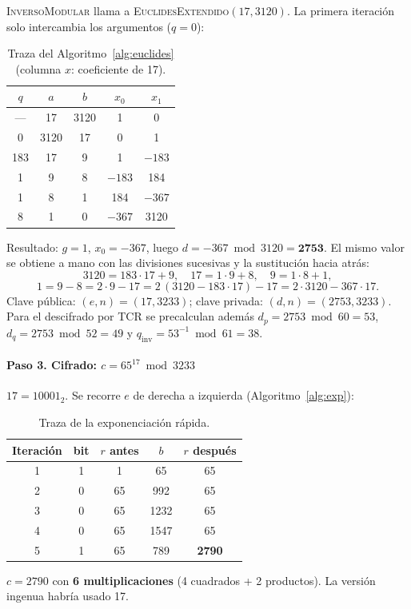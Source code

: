 \textsc{InversoModular} llama a \textsc{EuclidesExtendido}$(17, 3120)$. La
primera iteración solo intercambia los argumentos ($q = 0$):

\begin{table}[H]
\centering\small
\caption{Traza del Algoritmo~\ref{alg:euclides} (columna $x$: coeficiente de 17).}
\label{tab:traza-euclides}
\begin{tabular}{@{}c c c c c@{}}
\toprule
$q$ & $a$ & $b$ & $x_0$ & $x_1$\\
\midrule
--- & 17 & 3120 & 1 & 0\\
0 & 3120 & 17 & 0 & 1\\
183 & 17 & 9 & 1 & $-183$\\
1 & 9 & 8 & $-183$ & 184\\
1 & 8 & 1 & 184 & $-367$\\
8 & 1 & 0 & $-367$ & 3120\\
\bottomrule
\end{tabular}
\end{table}
\noindent Resultado: $g = 1$, $x_0 = -367$, luego
$d = -367 \bmod 3120 = \mathbf{2753}$. El mismo valor se obtiene a mano
con las divisiones sucesivas y la sustitución hacia atrás:
\[
3120 = 183 \cdot 17 + 9,\quad 17 = 1 \cdot 9 + 8,\quad 9 = 1 \cdot 8 + 1,
\]
\[
1 = 9 - 8 = 2 \cdot 9 - 17 = 2\,(3120 - 183 \cdot 17) - 17 = 2 \cdot 3120 - 367 \cdot 17.
\]
Clave pública: $(e, n) = (17, 3233)$; clave privada: $(d, n) = (2753, 3233)$.
Para el descifrado por TCR se precalculan además
$d_p = 2753 \bmod 60 = 53$, $d_q = 2753 \bmod 52 = 49$ y
$q_{\mathrm{inv}} = 53^{-1} \bmod 61 = 38$.

\paragraph{Paso 3. Cifrado: $c = 65^{17} \bmod 3233$}

$17 = 10001_2$. Se recorre $e$ de derecha a izquierda (Algoritmo~\ref{alg:exp}):

\begin{table}[H]
\centering\small
\caption{Traza de la exponenciación rápida.}
\label{tab:traza-exp}
\begin{tabular}{@{}c c c c c@{}}
\toprule
Iteración & bit & $r$ antes & $b$ & $r$ después\\
\midrule
1 & 1 & 1 & 65 & 65\\
2 & 0 & 65 & 992 & 65\\
3 & 0 & 65 & 1232 & 65\\
4 & 0 & 65 & 1547 & 65\\
5 & 1 & 65 & 789 & \textbf{2790}\\
\bottomrule
\end{tabular}
\end{table}
\noindent $c = 2790$ con \textbf{6 multiplicaciones} (4 cuadrados + 2
productos). La versión ingenua habría usado 17.

